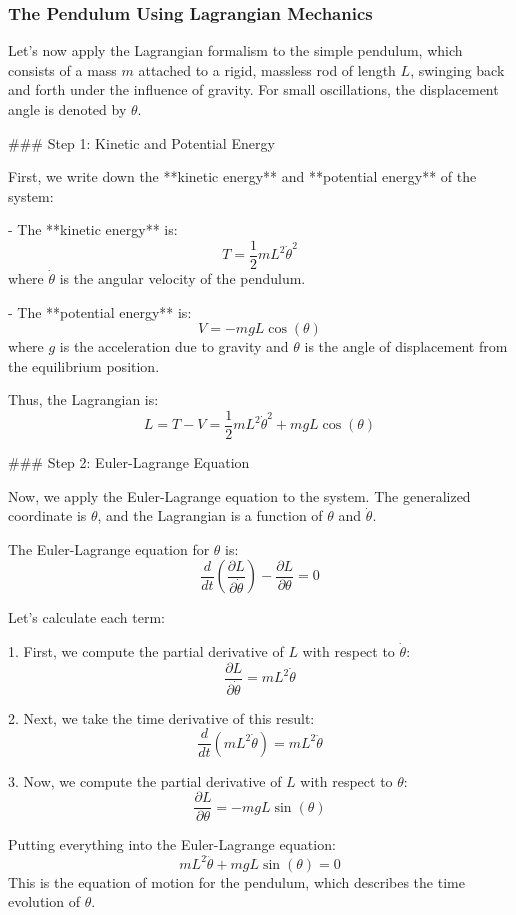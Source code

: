 \documentclass{article}
\begin{document}
\subsubsection*{The Pendulum Using Lagrangian Mechanics}

Let’s now apply the Lagrangian formalism to the simple pendulum, which consists of a mass \( m \) attached to a rigid, massless rod of length \( L \), swinging back and forth under the influence of gravity. For small oscillations, the displacement angle is denoted by \( \theta \).

### Step 1: Kinetic and Potential Energy

First, we write down the **kinetic energy** and **potential energy** of the system:

- The **kinetic energy** is:
  \[
  T = \frac{1}{2} m L^2 \dot{\theta}^2
  \]
  where \( \dot{\theta} \) is the angular velocity of the pendulum.

- The **potential energy** is:
  \[
  V = -mgL \cos(\theta)
  \]
  where \( g \) is the acceleration due to gravity and \( \theta \) is the angle of displacement from the equilibrium position.

Thus, the Lagrangian is:
\[
L = T - V = \frac{1}{2} m L^2 \dot{\theta}^2 + mgL \cos(\theta)
\]

### Step 2: Euler-Lagrange Equation

Now, we apply the Euler-Lagrange equation to the system. The generalized coordinate is \( \theta \), and the Lagrangian is a function of \( \theta \) and \( \dot{\theta} \).

The Euler-Lagrange equation for \( \theta \) is:
\[
\frac{d}{dt} \left( \frac{\partial L}{\partial \dot{\theta}} \right) - \frac{\partial L}{\partial \theta} = 0
\]

Let’s calculate each term:

1. First, we compute the partial derivative of \( L \) with respect to \( \dot{\theta} \):
   \[
   \frac{\partial L}{\partial \dot{\theta}} = m L^2 \dot{\theta}
   \]

2. Next, we take the time derivative of this result:
   \[
   \frac{d}{dt} \left( m L^2 \dot{\theta} \right) = m L^2 \ddot{\theta}
   \]

3. Now, we compute the partial derivative of \( L \) with respect to \( \theta \):
   \[
   \frac{\partial L}{\partial \theta} = -mgL \sin(\theta)
   \]

Putting everything into the Euler-Lagrange equation:
\[
m L^2 \ddot{\theta} + mgL \sin(\theta) = 0
\]
This is the equation of motion for the pendulum, which describes the time evolution of \( \theta \).
\end{document}
